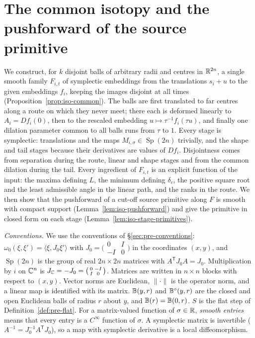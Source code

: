 \section{The common isotopy and the pushforward of the source primitive}\label{sec:iso}

We construct, for $k$ disjoint balls of arbitrary radii and centres in $\mathbb{R}^{2n}$, a single smooth family $F_{i,t}$ of
symplectic embeddings from the translations $s_i+u$ to the given embeddings $f_i$, keeping the images disjoint at all
times (Proposition~\ref{prop:iso-common}). The balls are first translated to far centres along a route on which they
never meet; there each is deformed linearly to $A_i=Df_i(0)$, then to the rescaled embedding $u\mapsto\tau^{-1}f_i(\tau u)$,
and finally one dilation parameter common to all balls runs from $\tau$ to $1$. Every stage is symplectic: translations
and the maps $M_{i,\sigma}\in\operatorname{Sp}(2n)$ trivially, and the shape and tail stages because their derivatives are
values of $Df_i$. Disjointness comes from separation during the route, linear and shape stages and from the common
dilation during the tail. Every ingredient of $F_{i,t}$ is an explicit function of the input: the maxima defining $L$,
the minimum defining $\delta_c$, the positive square root and the least admissible angle in the linear path, and the ranks
in the route. We then show that the pushforward of a cut-off source primitive along $F$ is smooth with compact support
(Lemma~\ref{lem:iso-pushforward}) and give the primitive in closed form on each stage
(Lemma~\ref{lem:iso-stage-primitives}).

\emph{Conventions.} We use the conventions of \S\ref{sec:pre-conventions}: $\omega_0(\xi,\xi')=\langle\xi,J_0\xi'\rangle$ with
$J_0=\bigl(\begin{smallmatrix}0&I\\-I&0\end{smallmatrix}\bigr)$ in the coordinates $(x,y)$, and $\operatorname{Sp}(2n)$ is
the group of real $2n\times2n$ matrices with $A^{\mathsf T}J_0A=J_0$. Multiplication by $i$ on $\mathbb{C}^n$ is
$J_{\mathbb{C}}=-J_0=\bigl(\begin{smallmatrix}0&-I\\I&0\end{smallmatrix}\bigr)$. Matrices are written in $n\times n$ blocks with
respect to $(x,y)$. Vector norms are Euclidean, $\|\cdot\|$ is the operator norm, and a linear map is identified with
its matrix. $\mathbb{B}(y,r)$ and $\mathbb{B}^\circ(y,r)$ are the closed and open Euclidean balls of radius $r$ about $y$, and
$\mathbb{B}(r)=\mathbb{B}(0,r)$. $S$ is the flat step of Definition~\ref{def:pre-flat}. For a matrix-valued function of $\sigma\in\mathbb{R}$,
\emph{smooth entries} means that every entry is a $C^\infty$ function of $\sigma$. A symplectic matrix is invertible
($A^{-1}=J_0^{-1}A^{\mathsf T}J_0$), so a map with symplectic derivative is a local diffeomorphism.

